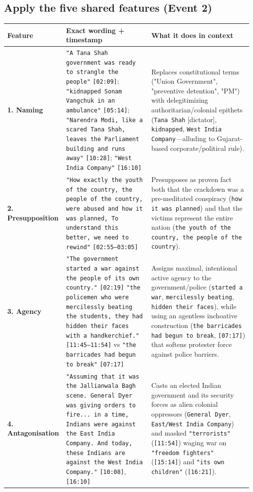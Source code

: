\documentclass[10pt,a4paper]{article}
\begin{document}
\subsection*{Apply the five shared features (Event 2)}
\begin{longtable}{@{}>{\raggedright\arraybackslash}p{} >{\raggedright\arraybackslash}p{} >{\raggedright\arraybackslash}p{}@{}}
\toprule
\textbf{Feature} & \textbf{Exact wording + timestamp} & \textbf{What it does in context} \\
\midrule
\endhead
\textbf{1. Naming} & \texttt{"A Tana Shah government was ready to strangle the people"} \texttt{[02:09]}; \texttt{"kidnapped Sonam Vangchuk in an ambulance"} \texttt{[05:14]}; \texttt{"Narendra Modi, like a scared Tana Shah, leaves the Parliament building and runs away"} \texttt{[10:28]}; \texttt{"West India Company"} \texttt{[16:10]} & Replaces constitutional terms ("Union Government", "preventive detention", "PM") with delegitimizing authoritarian/colonial epithets (\texttt{Tana Shah} [dictator], \texttt{kidnapped}, \texttt{West India Company}---alluding to Gujarat-based corporate/political rule). \\
\addlinespace[4pt]
\textbf{2. Presupposition} & \texttt{"How exactly the youth of the country, the people of the country, were abused and how it was planned, To understand this better, we need to rewind"} \texttt{[02:55--03:05]} & Presupposes as proven fact both that the crackdown was a pre-meditated conspiracy (\texttt{how it was planned}) and that the victims represent the entire nation (\texttt{the youth of the country, the people of the country}). \\
\addlinespace[4pt]
\textbf{3. Agency} & \texttt{"The government started a war against the people of its own country."} \texttt{[02:19]} \newline  \texttt{"the policemen who were mercilessly beating the students, they had hidden their faces with a handkerchief."} \texttt{[11:45--11:54]} vs \texttt{"the barricades had begun to break"} \texttt{[07:17]} & Assigns maximal, intentional active agency to the government/police (\texttt{started a war}, \texttt{mercilessly beating}, \texttt{hidden their faces}), while using an agentless inchoative construction (\texttt{the barricades had begun to break}, \texttt{[07:17]}) that softens protester force against police barriers. \\
\addlinespace[4pt]
\textbf{4. Antagonisation} & \texttt{"Assuming that it was the Jallianwala Bagh scene. General Dyer was giving orders to fire... in a time, Indians were against the East India Company. And today, these Indians are against the West India Company."} \texttt{[10:08]}, \texttt{[16:10]} & Casts an elected Indian government and its security forces as alien colonial oppressors (\texttt{General Dyer}, \texttt{East/West India Company}) and masked \texttt{"terrorists"} (\texttt{[11:54]}) waging war on \texttt{"freedom fighters"} (\texttt{[15:14]}) and \texttt{"its own children"} (\texttt{[16:21]}). \\

\end{longtable}
\end{document}
